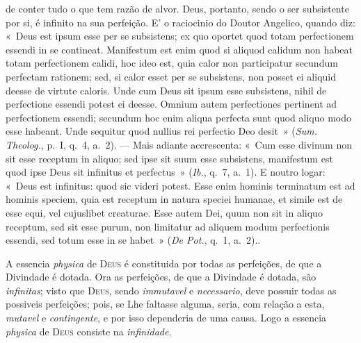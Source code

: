 {de conter tudo o que tem razão de alvor. Deus, portanto, sendo o ser subsistente por si,
é infinito na sua perfeição. E' o raciocinio do Doutor Angelico, quando diz: «~Deus est
ipsum esse per se subsistens; ex quo oportet quod totam perfectionem essendi in se
contineat. Manifestum est enim quod si aliquod calidum non habeat totam perfectionem
calidi, hoc ideo est, quia calor non participatur secundum perfectam rationem; sed, si
calor esset per se subsistens, non posset ei aliquid deesse de virtute caloris. Unde cum
Deus sit ipsum esse subsistens, nihil de perfectione essendi potest ei deesse. Omnium
autem perfectiones pertinent ad perfectionem essendi; secundum hoc enim aliqua perfecta
sunt quod aliquo modo esse habeant. Unde sequitur quod nullius rei perfectio Deo desit~»
(\emph{Sum. Theolog.}, p.~I, q.~4, a.~2). --- Mais adiante accrescenta: «~Cum esse
divinum non sit esse receptum in aliquo; sed ipse sit suum esse subsistens, manifestum est
quod ipse Deus sit infinitus et perfectus~» (\emph{Ib.}, q.~7, a.~1). E noutro logar:
«~Deus est infinitus: quod sic videri potest. Esse enim hominis terminatum est ad hominis
speciem, quia est receptum in natura speciei humanae, et simile est de esse equi, vel
cujuslibet creaturae. Esse autem Dei, quum non sit in aliquo receptum, sed sit esse
purum, non limitatur ad aliquem modum perfectionis essendi, sed totum esse in se habet~»
(\emph{De Pot.}, q.~1, a.~2).}.

 A essencia \emph{physica} de \textsc{Deus} é constituida por todas as
perfeições, de que a Divindade é dotada. Ora as perfeições, de que a Divindade é dotada,
são \emph{infinitas}; visto que \textsc{Deus}, sendo \emph{immutavel} e
\emph{necessario}, deve possuir todas as possiveis perfeições; pois, se Lhe faltasse
alguma, seria, com relação a esta, \emph{mutavel} e \emph{contingente}, e por isso
dependeria de uma causa. Logo a essencia \emph{physica} de \textsc{Deus} consiste na
\emph{infinidade}.

